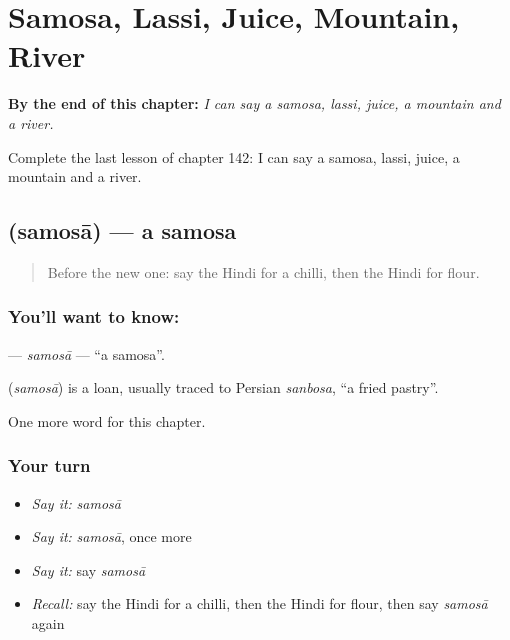 
\chapter{Samosa, Lassi, Juice, Mountain, River}
\label{ch:hi-samosa-lassi-juice-mountain-river}

\begin{chapteropening}
\textbf{By the end of this chapter:} \emph{I can say a samosa, lassi, juice, a mountain and a river.}

Complete the last lesson of chapter 142: I can say a samosa, lassi, juice, a mountain and a river.
\end{chapteropening}

\section[\texorpdfstring{\hi{समोसा} (samosā)}{समोसा (samosā)}]{ (samosā) — a samosa}

\label{lesson:HI-C142-samosa}



\begin{quote}
Before the new one: say the Hindi for a chilli, then the Hindi for flour.
\end{quote}

\subsection*{You'll want to know: }
\textbf{} — \emph{samosā} — \textquotedblleft{}a samosa\textquotedblright{}.

\begin{cousinweb}
\textbf{} (\emph{samosā}) is a loan, usually traced to Persian \emph{sanbosa}, \textquotedblleft{}a fried pastry\textquotedblright{}.
\end{cousinweb}

\begin{grammarlens}[title={What you've built}]
One more word for this chapter.
\end{grammarlens}

\subsection*{Your turn}
\begin{itemize}
\raggedright
  \item \emph{Say it:} \emph{samosā}
  \item \emph{Say it:} \emph{samosā}, once more
  \item \emph{Say it:} say \emph{samosā}
  \item \emph{Recall:} say the Hindi for a chilli, then the Hindi for flour, then say \emph{samosā} again
\end{itemize}

